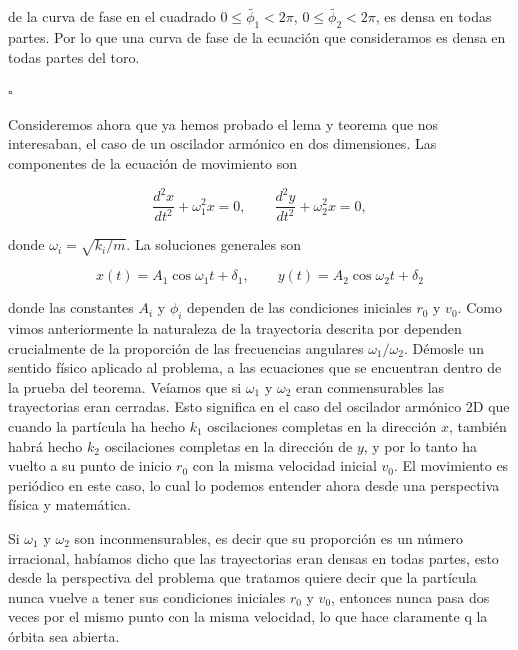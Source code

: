 \documentclass[a4paper,10pt]{article}
\numberwithin{equation}{section}
\begin{document}
de la curva de fase en el cuadrado $0 \leq \tilde{\phi_1} < 2\pi $, 
$0 \leq \tilde{\phi_2} < 2\pi $, es densa en todas partes. Por lo que 
una curva de fase de la ecuación que consideramos es densa en todas 
partes del toro.

\vspace{.2cm} \hspace{12cm} $\square$

Consideremos ahora que ya hemos probado el lema y teorema que nos interesaban,
el caso de un oscilador armónico en dos dimensiones. Las componentes de 
la ecuación de movimiento son

\begin{equation}
 \frac{d^2x}{dt^2} + \omega_1^2 x = 0, \qquad \frac{d^2y}{dt^2} + \omega_2^2 x = 0,
\end{equation}

donde $\omega_i = \sqrt{k_i/m}$. La soluciones generales son

\begin{equation}
 x(t) = A_1 \cos{\omega_1 t + \delta_1}, \qquad y(t) = A_2 \cos{\omega_2 t + \delta_2}
\label{eq:solOsci2D}
\end{equation}

donde las constantes $A_i$ y $\phi_i$ dependen de las condiciones iniciales 
$r_0$ y $v_0$. Como vimos anteriormente la naturaleza de la trayectoria descrita 
por  dependen crucialmente de la proporción de las frecuencias 
angulares $\omega_1/\omega_2$. Démosle un sentido físico aplicado al problema, a las 
ecuaciones que se encuentran dentro de la prueba del teorema. Veíamos que 
si $\omega_1$ y $\omega_2$ eran conmensurables las trayectorias eran cerradas. Esto
significa en el caso del oscilador armónico 2D que cuando la partícula 
ha hecho $k_1$ oscilaciones completas en la dirección $x$, también
habrá hecho $k_2$ oscilaciones completas en la dirección de $y$, y por 
lo tanto ha vuelto a su punto de inicio $r_0$ con la misma velocidad inicial 
$v_0$. El movimiento es periódico en este caso, lo cual lo podemos entender ahora
desde una perspectiva física y matemática.

\vspace{.3cm}

Si $\omega_1$ y $\omega_2$ son inconmensurables, es decir que su proporción 
es un número irracional, habíamos dicho que las trayectorias eran densas 
en todas partes, esto desde la perspectiva del problema que tratamos quiere decir 
que la partícula nunca vuelve a tener sus condiciones iniciales $r_0$ y $v_0$,
entonces nunca pasa dos veces por el mismo punto con la misma velocidad, lo 
que hace claramente q la órbita sea abierta.
\end{document}
